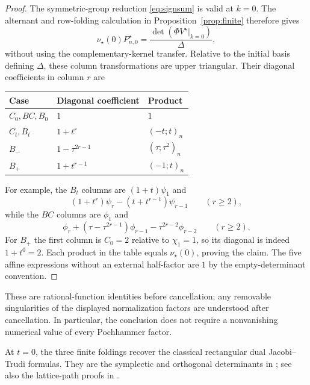 \documentclass[12pt]{article}
\numberwithin{equation}{section}
\newcommand{\ph}{\phi}
\newcommand{\ps}{\psi}
\begin{document}
\begin{proof}
The symmetric-group reduction \eqref{eq:signsum} is valid at $k=0$.
The alternant and row-folding calculation in Proposition~\ref{prop:finite}
therefore gives
\[
 \nu_\star(0)P^\star_{n,0}
 =\frac{\det(\Phi V^\star|_{k=0})}{\Delta},
\]
without using the complementary-kernel transfer.
Relative to the initial basis defining $\Delta$, these column
transformations are upper triangular.  Their diagonal coefficients in
column $r$ are
\begin{center}
\renewcommand{\arraystretch}{1.2}
\begin{tabular}{@{}lll@{}}
\toprule
Case & Diagonal coefficient & Product\\
\midrule
$C_0,BC,B_0$ & $1$ & $1$\\
$C_t,B_t$ & $1+t^r$ & $(-t;t)_n$\\
$B_-$ & $1-\tau^{2r-1}$ & $(\tau;\tau^2)_n$\\
$B_+$ & $1+t^{r-1}$ & $(-1;t)_n$\\
\bottomrule
\end{tabular}
\end{center}
For example, the $B_t$ columns are $(1+t)\ps_1$ and
\[
 (1+t^r)\ps_r-(t+t^{r-1})\ps_{r-1}\qquad(r\ge2),
\]
while the $BC$ columns are $\ph_1$ and
\[
 \ph_r+(\tau-\tau^{2r-1})\ph_{r-1}
        -\tau^{2r-2}\ph_{r-2}\qquad(r\ge2).
\]
For $B_+$ the first column is $C_0=2$ relative to $\chi_1=1$,
so its diagonal is indeed $1+t^0=2$.
Each product in the table equals $\nu_\star(0)$, proving the claim.
The five affine expressions without an external half-factor are $1$
by the empty-determinant convention.
\end{proof}

These are rational-function identities before cancellation; any
removable singularities of the displayed normalization factors are
understood after cancellation.  In particular, the conclusion does not
require a nonvanishing numerical value of every Pochhammer factor.

At $t=0$, the three finite foldings recover the classical rectangular
dual Jacobi--Trudi formulas.  They are the symplectic and orthogonal
determinants in \cite[Theorem~2.1]{AlbionEtAl2024}; see also the
lattice-path proofs in \cite{FulmekKrattenthaler1997}.
\end{document}
